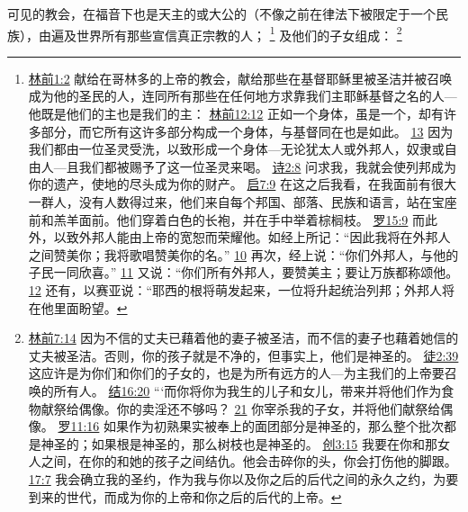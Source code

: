 \documentclass[12pt, a4paper, oneside]{ctexart}
\newcounter{parnum}[section]
\newcommand{\N}{%
   \noindent\refstepcounter{parnum}%
    \makebox[\parindent][l]{\textbf{\arabic{parnum}.}}}
\begin{document}
\N 可见的教会，在福音下也是天主的或大公的（不像之前在律法下被限定于一个民族），由遍及世界所有那些宣信真正宗教的人；
	\footnote {
		\href{https://biblehub.com/1_corinthians/1-2.htm}{林前1:2} 献给在哥林多的上帝的教会，献给那些在基督耶稣里被圣洁并被召唤成为他的圣民的人，连同所有那些在任何地方求靠我们主耶稣基督之名的人---他既是他们的主也是我们的主：
		\href{https://biblehub.com/1_corinthians/12-12.htm}{林前12:12} 正如一个身体，虽是一个，却有许多部分，而它所有这许多部分构成一个身体，与基督同在也是如此。
		\href{https://biblehub.com/1_corinthians/12-13.htm}{13} 因为我们都由一位圣灵受洗，以致形成一个身体---无论犹太人或外邦人，奴隶或自由人---且我们都被赐予了这一位圣灵来喝。
		\href{https://biblehub.com/psalms/2-8.htm}{诗2:8} 问求我，我就会使列邦成为你的遗产，使地的尽头成为你的财产。
		\href{https://biblehub.com/revelation/7-9.htm}{启7:9} 在这之后我看，在我面前有很大一群人，没有人数得过来，他们来自每个邦国、部落、民族和语言，站在宝座前和羔羊面前。他们穿着白色的长袍，并在手中举着棕榈枝。
		\href{https://biblehub.com/romans/15-9.htm}{罗15:9} 而此外，以致外邦人能由上帝的宽恕而荣耀他。如经上所记：“因此我将在外邦人之间赞美你；我将歌唱赞美你的名。”
		\href{https://biblehub.com/romans/15-10.htm}{10} 再次，经上说：“你们外邦人，与他的子民一同欣喜。”
		\href{https://biblehub.com/romans/15-11.htm}{11} 又说：“你们所有外邦人，要赞美主；要让万族都称颂他。
		\href{https://biblehub.com/romans/15-12.htm}{12} 还有，以赛亚说：“耶西的根将萌发起来，一位将升起统治列邦；外邦人将在他里面盼望。
	}
	及他们的子女组成：
	\footnote {
		\href{https://biblehub.com/1_corinthians/7-14.htm}{林前7:14} 因为不信的丈夫已藉着他的妻子被圣洁，而不信的妻子也藉着她信的丈夫被圣洁。否则，你的孩子就是不净的，但事实上，他们是神圣的。
		\href{https://biblehub.com/acts/2-39.htm}{徒2:39} 这应许是为你们和你们的子女的，也是为所有远方的人---为主我们的上帝要召唤的所有人。
		\href{https://biblehub.com/ezekiel/16-20.htm}{结16:20} “‘而你将你为我生的儿子和女儿，带来并将他们作为食物献祭给偶像。你的卖淫还不够吗？
		\href{https://biblehub.com/ezekiel/16-21.htm}{21} 你宰杀我的子女，并将他们献祭给偶像。
		\href{https://biblehub.com/romans/11-16.htm}{罗11:16} 如果作为初熟果实被奉上的面团部分是神圣的，那么整个批次都是神圣的；如果根是神圣的，那么树枝也是神圣的。
		\href{https://biblehub.com/genesis/3-15.htm}{创3:15} 我要在你和那女人之间，在你的和她的孩子之间结仇。他会击碎你的头，你会打伤他的脚跟。
		\href{https://biblehub.com/genesis/17-7.htm}{17:7} 我会确立我的圣约，作为我与你以及你之后的后代之间的永久之约，为要到来的世代，而成为你的上帝和你之后的后代的上帝。
	}
\end{document}
